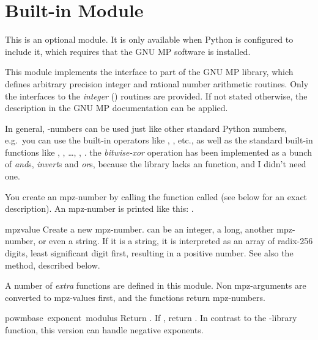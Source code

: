 \section{Built-in Module }
\label{module-mpz}

This is an optional module.  It is only available when Python is
configured to include it, which requires that the GNU MP software is
installed.

This module implements the interface to part of the GNU MP library,
which defines arbitrary precision integer and rational number
arithmetic routines.  Only the interfaces to the \emph{integer}
() routines are provided. If not stated
otherwise, the description in the GNU MP documentation can be applied.

In general, -numbers can be used just like other standard
Python numbers, e.g.\ you can use the built-in operators like \code{+},
\code{*}, etc., as well as the standard built-in functions like
, , \ldots, , .
 the \emph{bitwise-xor} operation has been implemented as
a bunch of \emph{and}s, \emph{invert}s and \emph{or}s, because the library
lacks an  function, and I didn't need one.

You create an mpz-number by calling the function called  (see
below for an exact description). An mpz-number is printed like this:
.

\begin{funcdesc}{mpz}{value}
  Create a new mpz-number.  can be an integer, a long,
  another mpz-number, or even a string. If it is a string, it is
  interpreted as an array of radix-256 digits, least significant digit
  first, resulting in a positive number. See also the 
  method, described below.
\end{funcdesc}

A number of \emph{extra} functions are defined in this module. Non
mpz-arguments are converted to mpz-values first, and the functions
return mpz-numbers.

\begin{funcdesc}{powm}{base\, exponent\, modulus}
  Return . If
  , return . In contrast to the
  \C-library function, this version can handle negative exponents.
\end{funcdesc}

